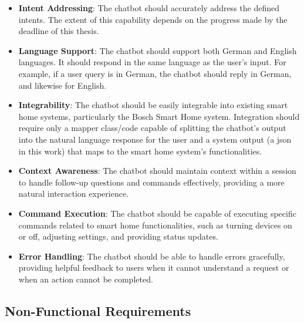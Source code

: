 \begin{itemize}
    \item \textbf{Intent Addressing}: The chatbot should accurately address the defined intents. The extent of this capability depends on the progress made by the deadline of this thesis.
    
    \item \textbf{Language Support}: The chatbot should support both German and English languages. It should respond in the same language as the user's input. For example, if a user query is in German, the chatbot should reply in German, and likewise for English.
    
    \item \textbf{Integrability}: The chatbot should be easily integrable into existing smart home systems, particularly the Bosch Smart Home system. Integration should require only a mapper class/code capable of splitting the chatbot's output into the natural language response for the user and a system output (a \gls{json} in this work) that maps to the smart home system's functionalities.
    
    \item \textbf{Context Awareness}: The chatbot should maintain context within a session to handle follow-up questions and commands effectively, providing a more natural interaction experience.
    
    \item \textbf{Command Execution}: The chatbot should be capable of executing specific commands related to smart home functionalities, such as turning devices on or off, adjusting settings, and providing status updates.
    
    \item \textbf{Error Handling}: The chatbot should be able to handle errors gracefully, providing helpful feedback to users when it cannot understand a request or when an action cannot be completed.
\end{itemize}

\subsection{Non-Functional Requirements}

